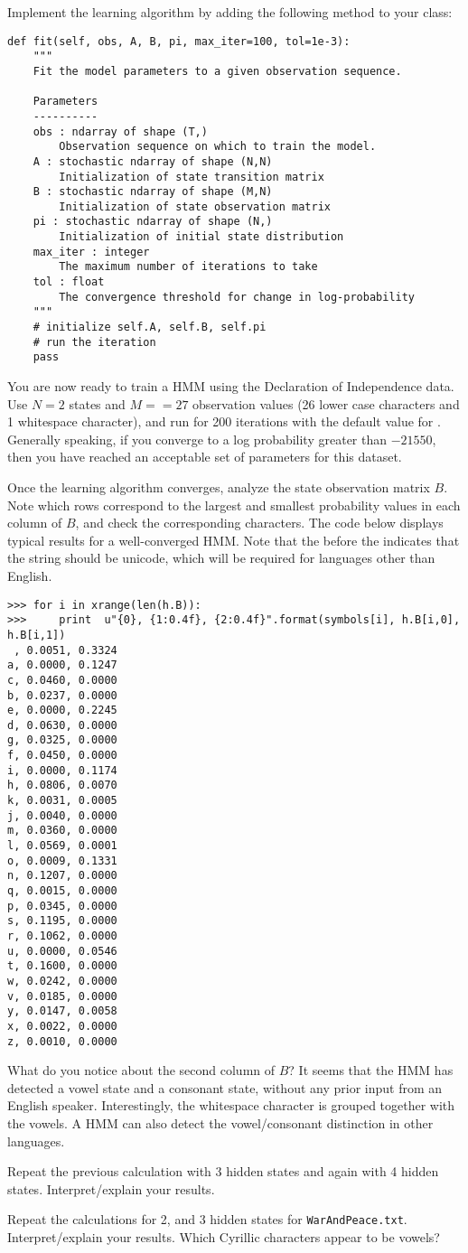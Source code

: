 Implement the learning algorithm by adding the following method to your class:
\begin{lstlisting}
def fit(self, obs, A, B, pi, max_iter=100, tol=1e-3):
    """
    Fit the model parameters to a given observation sequence.

    Parameters
    ----------
    obs : ndarray of shape (T,)
        Observation sequence on which to train the model.
    A : stochastic ndarray of shape (N,N)
        Initialization of state transition matrix
    B : stochastic ndarray of shape (M,N)
        Initialization of state observation matrix
    pi : stochastic ndarray of shape (N,)
        Initialization of initial state distribution
    max_iter : integer
        The maximum number of iterations to take
    tol : float
        The convergence threshold for change in log-probability
    """
    # initialize self.A, self.B, self.pi
    # run the iteration
    pass
\end{lstlisting}

You are now ready to train a HMM using the Declaration of Independence data.
Use $N=2$ states and $M=$$=27$ observation values (26 lower case characters and 1 whitespace character),
and run for 200 iterations with the default value for .
Generally speaking, if you converge to a log probability greater than $-21550$, then you have reached
an acceptable set of parameters for this dataset.

Once the learning algorithm converges, analyze the state observation matrix $B$.
Note which rows correspond to the largest and smallest probability values in each column of $B$,
and check the corresponding characters.
The code below displays typical results for a well-converged HMM.  Note that the  before the  indicates that the string should be unicode, which will be required for languages other than English.
\begin{lstlisting}
>>> for i in xrange(len(h.B)):
>>>     print  u"{0}, {1:0.4f}, {2:0.4f}".format(symbols[i], h.B[i,0], h.B[i,1])
 , 0.0051, 0.3324
a, 0.0000, 0.1247
c, 0.0460, 0.0000
b, 0.0237, 0.0000
e, 0.0000, 0.2245
d, 0.0630, 0.0000
g, 0.0325, 0.0000
f, 0.0450, 0.0000
i, 0.0000, 0.1174
h, 0.0806, 0.0070
k, 0.0031, 0.0005
j, 0.0040, 0.0000
m, 0.0360, 0.0000
l, 0.0569, 0.0001
o, 0.0009, 0.1331
n, 0.1207, 0.0000
q, 0.0015, 0.0000
p, 0.0345, 0.0000
s, 0.1195, 0.0000
r, 0.1062, 0.0000
u, 0.0000, 0.0546
t, 0.1600, 0.0000
w, 0.0242, 0.0000
v, 0.0185, 0.0000
y, 0.0147, 0.0058
x, 0.0022, 0.0000
z, 0.0010, 0.0000
\end{lstlisting}
What do you notice about the second column of $B$? It seems that the HMM has detected a vowel state and a consonant state, without any prior input from an English speaker.
Interestingly, the whitespace character is grouped together with the vowels. A HMM can also detect the vowel/consonant distinction in other languages. 

Repeat the previous calculation with 3 hidden states and again with 4 hidden states.  Interpret/explain your results.

Repeat the calculations for 2, and 3 hidden states for \texttt{WarAndPeace.txt}.
Interpret/explain your results.  Which Cyrillic characters appear to be vowels? 
